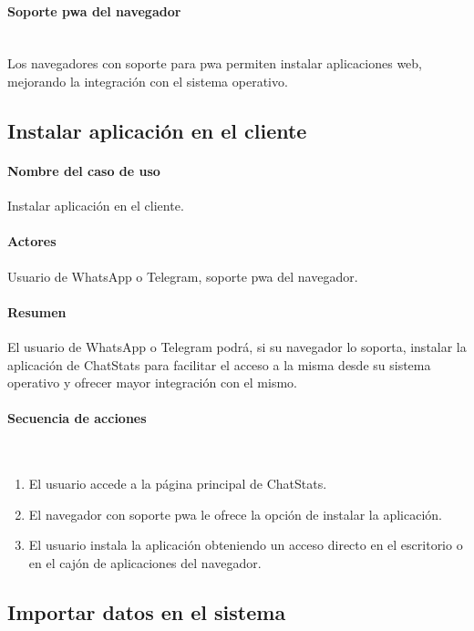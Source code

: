 \paragraph{Soporte \acrshort{pwa} del navegador}\mbox{}\\

Los navegadores con soporte para \acrfull{pwa} permiten instalar aplicaciones web, mejorando la integración con el sistema operativo.

\subsection{Instalar aplicación en el cliente}

\paragraph{Nombre del caso de uso} Instalar aplicación en el cliente.
\paragraph{Actores} Usuario de WhatsApp o Telegram, soporte \acrshort{pwa} del navegador.
\paragraph{Resumen} El usuario de WhatsApp o Telegram podrá, si su navegador lo soporta, instalar la aplicación de ChatStats para facilitar el acceso a la misma desde su sistema operativo y ofrecer mayor integración con el mismo.
\paragraph{Secuencia de acciones}\mbox{}\\

\begin{enumerate}
	\item El usuario accede a la página principal de ChatStats.
	\item El navegador con soporte \acrshort{pwa} le ofrece la opción de instalar la aplicación.
	\item El usuario instala la aplicación obteniendo un acceso directo en el escritorio o en el cajón de aplicaciones del navegador.
\end{enumerate}

\subsection{Importar datos en el sistema}

